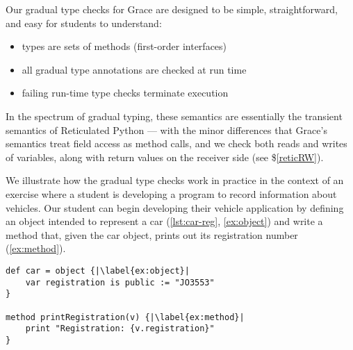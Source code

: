 Our gradual type checks for Grace are designed to be simple,
straightforward, and easy for students to understand:
\begin{itemize}
  \item types are sets of methods (first-order interfaces)
  \item all gradual type annotations are checked at run time
  \item failing run-time type checks terminate execution
\end{itemize}
%
%
In the spectrum of gradual typing, these semantics are essentially the
transient semantics of Reticulated Python
\cite{reticPython2014,Greenman2018} ---
with the minor differences that Grace's semantics
treat field access as method calls, and we check both reads and
writes of variables, along with return values on the receiver side
(see \$\ref{reticRW}).





We illustrate how the gradual type checks work in practice
in the context of an exercise where a student is developing
a program to record information about vehicles.
Our student can begin developing their vehicle
application by defining an object intended to represent a car
(\cref{lst:car-reg}, \cref{ex:object}) and write a method that, given
the car object, prints out its registration number (\cref{ex:method}).

\begin{lstlisting}[caption={The start of a simple program for tracking vehicle information.},float,label=lst:car-reg,escapechar=|,columns=flexible]
def car = object {|\label{ex:object}|
    var registration is public := "JO3553"
}

method printRegistration(v) {|\label{ex:method}|
    print "Registration: {v.registration}"
}
\end{lstlisting}

